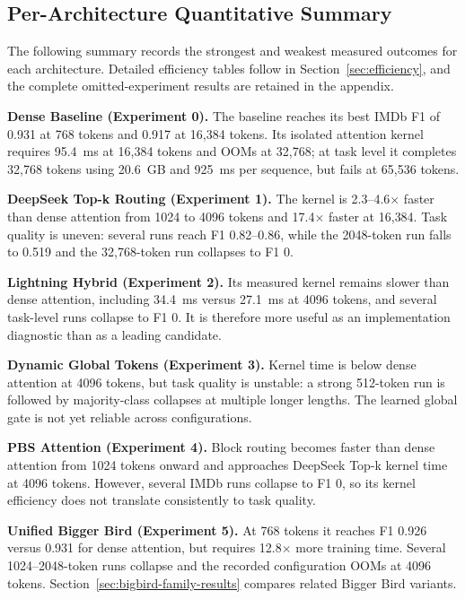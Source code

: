 \documentclass[11pt]{article}
\begin{document}
\subsection{Per-Architecture Quantitative Summary}

The following summary records the strongest and weakest measured outcomes for
each architecture. Detailed efficiency tables follow in
Section~\ref{sec:efficiency}, and the complete omitted-experiment results are
retained in the appendix.

\textbf{Dense Baseline (Experiment 0).} The baseline reaches its best IMDb F1
of 0.931 at 768 tokens and 0.917 at 16{,}384 tokens. Its isolated attention
kernel requires 95.4~ms at 16{,}384 tokens and OOMs at 32{,}768; at task level
it completes 32{,}768 tokens using 20.6~GB and 925~ms per sequence, but fails
at 65{,}536 tokens.

\textbf{DeepSeek Top-k Routing (Experiment 1).} The kernel is
2.3--4.6$\times$ faster than dense attention from 1024 to 4096 tokens and
17.4$\times$ faster at 16{,}384. Task quality is uneven: several runs reach
F1 0.82--0.86, while the 2048-token run falls to 0.519 and the 32{,}768-token
run collapses to F1 0.

\textbf{Lightning Hybrid (Experiment 2).} Its measured kernel remains slower
than dense attention, including 34.4~ms versus 27.1~ms at 4096 tokens, and
several task-level runs collapse to F1 0. It is therefore more useful as an
implementation diagnostic than as a leading candidate.

\textbf{Dynamic Global Tokens (Experiment 3).} Kernel time is below dense
attention at 4096 tokens, but task quality is unstable: a strong 512-token run
is followed by majority-class collapses at multiple longer lengths. The
learned global gate is not yet reliable across configurations.

\textbf{PBS Attention (Experiment 4).} Block routing becomes faster than
dense attention from 1024 tokens onward and approaches DeepSeek Top-k kernel
time at 4096 tokens. However, several IMDb runs collapse to F1 0, so its
kernel efficiency does not translate consistently to task quality.

\textbf{Unified Bigger Bird (Experiment 5).} At 768 tokens it reaches F1
0.926 versus 0.931 for dense attention, but requires 12.8$\times$ more
training time. Several 1024--2048-token runs collapse and the recorded
configuration OOMs at 4096 tokens. Section~\ref{sec:bigbird-family-results}
compares related Bigger Bird variants.
\end{document}
